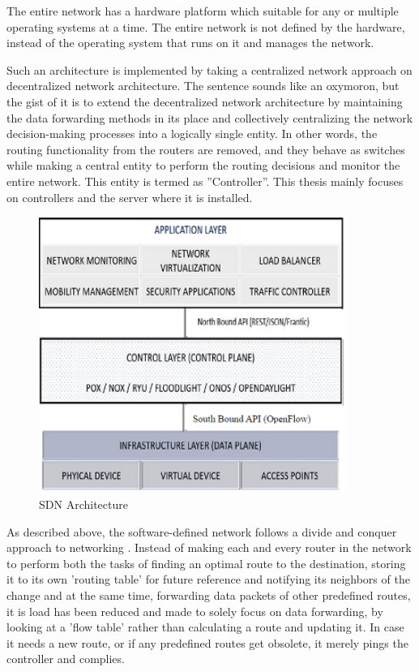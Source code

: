      The entire network has a hardware platform which suitable for any or multiple operating systems at a time. The entire network is not defined by the hardware, instead of the operating system that runs on it and manages the network.
    
    Such an architecture is implemented by taking a centralized network approach on decentralized network architecture. The sentence sounds like an oxymoron, but the gist of it is to extend the decentralized network architecture by maintaining the data forwarding methods in its place and collectively centralizing the network decision-making processes into a logically single entity. In other words, the routing functionality from the routers are removed, and they behave as switches while making a central entity to perform the routing decisions and monitor the entire network. This entity is termed as ''Controller''. This thesis mainly focuses on controllers and the server where it is installed.
    
\begin{figure}[!hbt]
    \centering
     \includegraphics[width=10cm,keepaspectratio]{images/SDN-architecture-example.png}
    \caption{SDN Architecture \cite{sdnimages}}
    \label{fig:SDN Architecure}
\end{figure}
    
    As described above, the software-defined network follows a divide and conquer approach to networking \cite{taxonomy2014}. Instead of making each and every router in the network to perform both the tasks of finding an optimal route to the destination, storing it to its own 'routing table' for future reference and notifying its neighbors of the change and at the same time, forwarding data packets of other predefined routes, it is load has been reduced and made to solely focus on data forwarding, by looking at a 'flow table' rather than calculating a route and updating it. In case it needs a new route, or if any predefined routes get obsolete, it merely pings the controller and complies.
    
